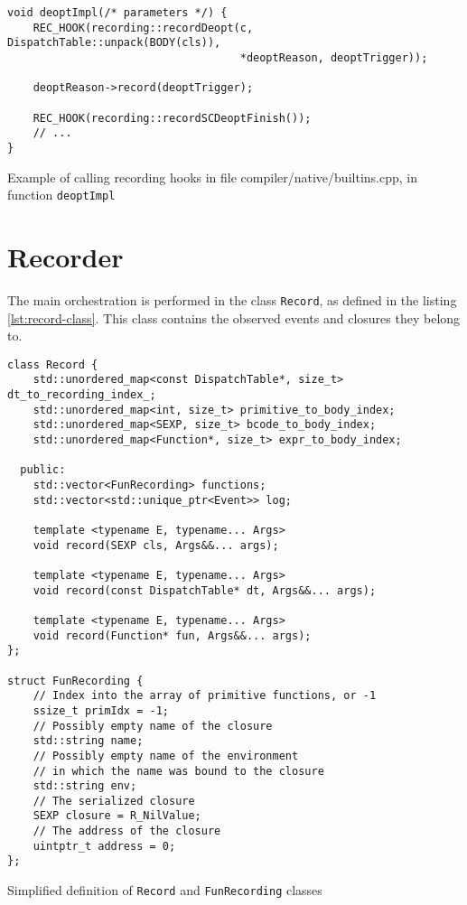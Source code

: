 \begin{listing}
	\begin{verbatim}
void deoptImpl(/* parameters */) {
    REC_HOOK(recording::recordDeopt(c, DispatchTable::unpack(BODY(cls)),
                                    *deoptReason, deoptTrigger));

    deoptReason->record(deoptTrigger);

    REC_HOOK(recording::recordSCDeoptFinish());
    // ...
}
  \end{verbatim}
	\caption{Example of calling recording hooks in file compiler/native/builtins.cpp, in function \texttt{deoptImpl}}\label{lst:hook-deopt}
\end{listing}


\section{Recorder}

The main orchestration is performed in the class \texttt{Record}, as defined in the listing \ref{lst:record-class}. This class contains the observed events and closures they belong to.

\begin{listing}
	\begin{verbatim}
class Record {
    std::unordered_map<const DispatchTable*, size_t> dt_to_recording_index_;
    std::unordered_map<int, size_t> primitive_to_body_index;
    std::unordered_map<SEXP, size_t> bcode_to_body_index;
    std::unordered_map<Function*, size_t> expr_to_body_index;

  public:
    std::vector<FunRecording> functions;
    std::vector<std::unique_ptr<Event>> log;

    template <typename E, typename... Args>
    void record(SEXP cls, Args&&... args);

    template <typename E, typename... Args>
    void record(const DispatchTable* dt, Args&&... args);

    template <typename E, typename... Args>
    void record(Function* fun, Args&&... args);
};

struct FunRecording {
    // Index into the array of primitive functions, or -1
    ssize_t primIdx = -1;
    // Possibly empty name of the closure
    std::string name;
    // Possibly empty name of the environment
    // in which the name was bound to the closure
    std::string env;
    // The serialized closure
    SEXP closure = R_NilValue;
    // The address of the closure
    uintptr_t address = 0;
};
  \end{verbatim}
	\caption{Simplified definition of \texttt{Record} and \texttt{FunRecording} classes }\label{lst:record-class}
\end{listing}

